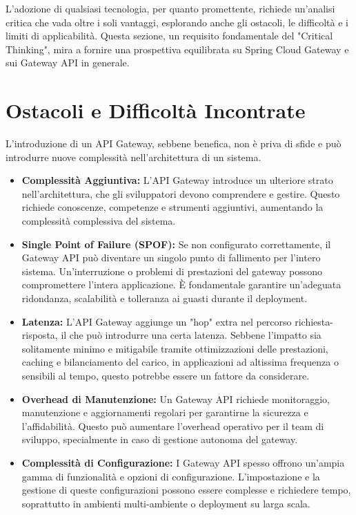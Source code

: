 L'adozione di qualsiasi tecnologia, per quanto promettente, richiede un'analisi critica che vada oltre i soli vantaggi, esplorando anche gli ostacoli, le difficoltà e i limiti di applicabilità. Questa sezione, un requisito fondamentale del "Critical Thinking", mira a fornire una prospettiva equilibrata su Spring Cloud Gateway e sui Gateway API in generale.

\section{Ostacoli e Difficoltà Incontrate}

L'introduzione di un API Gateway, sebbene benefica, non è priva di sfide e può introdurre nuove complessità nell'architettura di un sistema.

\begin{itemize}
    \item \textbf{Complessità Aggiuntiva:} L'API Gateway introduce un ulteriore strato nell'architettura, che gli sviluppatori devono comprendere e gestire. Questo richiede conoscenze, competenze e strumenti aggiuntivi, aumentando la complessità complessiva del sistema.
    \item \textbf{Single Point of Failure (SPOF):} Se non configurato correttamente, il Gateway API può diventare un singolo punto di fallimento per l'intero sistema. Un'interruzione o problemi di prestazioni del gateway possono compromettere l'intera applicazione. È fondamentale garantire un'adeguata ridondanza, scalabilità e tolleranza ai guasti durante il deployment.
    \item \textbf{Latenza:} L'API Gateway aggiunge un "hop" extra nel percorso richiesta-risposta, il che può introdurre una certa latenza. Sebbene l'impatto sia solitamente minimo e mitigabile tramite ottimizzazioni delle prestazioni, caching e bilanciamento del carico, in applicazioni ad altissima frequenza o sensibili al tempo, questo potrebbe essere un fattore da considerare.
    \item \textbf{Overhead di Manutenzione:} Un Gateway API richiede monitoraggio, manutenzione e aggiornamenti regolari per garantirne la sicurezza e l'affidabilità. Questo può aumentare l'overhead operativo per il team di sviluppo, specialmente in caso di gestione autonoma del gateway.
    \item \textbf{Complessità di Configurazione:} I Gateway API spesso offrono un'ampia gamma di funzionalità e opzioni di configurazione. L'impostazione e la gestione di queste configurazioni possono essere complesse e richiedere tempo, soprattutto in ambienti multi-ambiente o deployment su larga scala.
\end{itemize}

